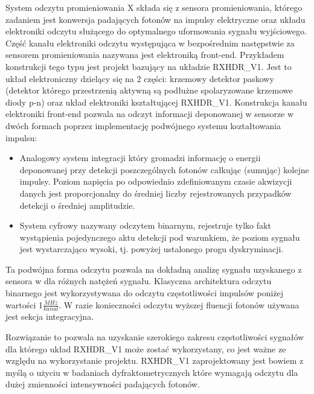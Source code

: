 System odczytu promieniowania X składa się z sensora promieniowania, którego zadaniem jest konwersja padających fotonów na impulsy elektryczne oraz układu elektroniki odczytu służącego do optymalnego uformowania  sygnału wyjściowego. Część kanału elektroniki odczytu występująca w bezpośrednim następstwie za sensorem promieniowania nazywana jest elektroniką front-end.
Przykładem konstrukcji tego typu jest projekt bazujący na układzie RXHDR\_V1. Jest to układ elektroniczny dzielący się na 2 części: krzemowy detektor paskowy (detektor którego przestrzenią aktywną są podłużne spolaryzowane krzemowe diody p-n) \cite{master} \cite{front-end} oraz układ elektroniki kształtującej RXHDR\_V1. Konstrukcja kanału elektroniki front-end pozwala na odczyt informacji deponowanej w sensorze w dwóch formach poprzez implementację podwójnego systemu kształtowania impulsu:
\begin{itemize}
        \item Analogowy system integracji który gromadzi informację o energii deponowanej przy detekcji poszczególnych fotonów całkując (sumując) kolejne impulsy. Poziom napięcia po odpowiednio zdefiniowanym czasie akwizycji danych jest proporcjonalny do średniej liczby rejestrowanych przypadków detekcji o średniej amplitudzie. 
        \item System cyfrowy nazywany odczytem binarnym, rejestruje tylko fakt wystąpienia pojedynczego aktu detekcji pod warunkiem, że poziom sygnału jest wystarczająco wysoki, tj. powyżej ustalonego progu dyskryminacji.
\end{itemize} 

Ta podwójna forma odczytu pozwala na dokładną analizę sygnału uzyskanego z sensora w dla różnych natężeń sygnału. Klasyczna architektura odczytu binarnego jest wykorzystywana do odczytu częstotliwości impulsów poniżej wartości 1$\frac{MHz}{kanal}$. W razie konieczności odczytu wyższej fluencji fotonów używana jest sekcja integracyjna. 

Rozwiązanie to pozwala na uzyskanie szerokiego zakresu częstotliwości sygnałów dla którego układ RXHDR\_V1 może zostać wykorzystany, co jest ważne ze względu na wykorzystanie projektu. 
RXHDR\_V1 zaprojektowany jest bowiem z myślą o użyciu w badaniach dyfraktometrycznych które wymagają odczytu dla dużej zmienności intensywności padających fotonów. 

